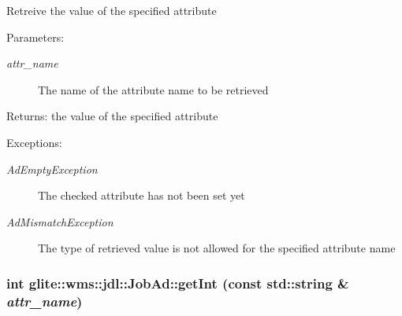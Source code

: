 Retreive the value of the specified attribute \begin{Desc}
\item[Parameters:]
\begin{description}
\item[{\em attr\_\-name}]The name of the attribute name to be retrieved \end{description}
\end{Desc}
\begin{Desc}
\item[Returns:]the value of the specified attribute \end{Desc}
\begin{Desc}
\item[Exceptions:]
\begin{description}
\item[{\em Ad\-Empty\-Exception}]The checked attribute has not been set yet \item[{\em Ad\-Mismatch\-Exception}]The type of retrieved value is not allowed for the specified attribute name \end{description}
\end{Desc}
\hypertarget{classglite_1_1wms_1_1jdl_1_1JobAd_z7_2}{
\subsubsection[getInt]{\setlength{\rightskip}{0pt plus 5cm}int glite::wms::jdl::Job\-Ad::get\-Int (const std::string \& {\em attr\_\-name})}}
\label{classglite_1_1wms_1_1jdl_1_1JobAd_z7_2}


